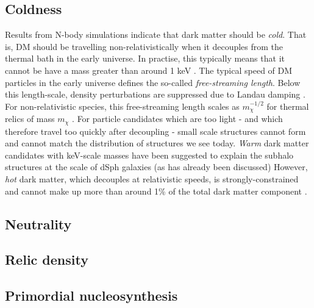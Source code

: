 \subsection{Coldness}

Results from N-body simulations indicate that dark matter should be \textit{cold}. That is, DM should be travelling non-relativistically when it decouples from the thermal bath in the early universe.  In practise, this typically means that it cannot be have a mass greater than around 1 keV \cite{Narayanan:2000}.   The typical speed of DM particles in the early universe defines the so-called \textit{free-streaming length}. Below this length-scale, density perturbations are suppressed due to Landau damping \cite{Bond:1983}. For non-relativistic species, this free-streaming length scales as $m_\chi^{-1/2}$ for thermal relics of mass $m_\chi$ \cite{Boyanovsky:2008} . For particle candidates which are too light - and which therefore travel too quickly after decoupling - small scale structures cannot form and cannot match the distribution of structures we see today.  \textit{Warm} dark matter candidates with keV-scale masses have been suggested to explain the subhalo structures at the scale of dSph galaxies (as has already been discussed) However, \textit{hot} dark matter, which decouples at relativistic speeds, is strongly-constrained and cannot make up more than around 1\% of the total dark matter component \cite{Abazajian:2005, dePutter:2012}.

\subsection{Neutrality}



\subsection{Relic density}



\subsection{Primordial nucleosynthesis}

